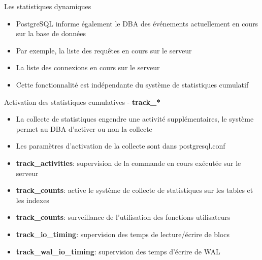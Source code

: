 
\begin{frame}[fragile]{Les statistiques dynamiques}

   \begin{itemize}
      \item PostgreSQL informe également le DBA des événements actuellement en cours sur la base de données
      \item Par exemple, la liste des requêtes en cours sur le serveur
      \item La liste des connexions en cours sur le serveur
      \item Cette fonctionnalité est indépendante du système de statistiques cumulatif
   \end{itemize}

\end{frame}


\begin{frame}[fragile]{Activation des statistiques cumulatives - \textbf{track\_*}}

   \begin{itemize}
      \item La collecte de statistiques engendre une activité supplémentaires, le système permet au DBA d'activer ou non la collecte
      \item Les paramètres d'activation de la collecte sont dans postgresql.conf
      \item \textbf{track\_activities}: supervision de la commande en cours exécutée sur le serveur
      \item \textbf{track\_counts}: active le système de collecte de statistiques sur les tables et les indexes
      \item \textbf{track\_counts}: surveillance de l'utilisation des fonctions utilisateurs
      \item \textbf{track\_io\_timing}: supervision des temps de lecture/écrire de blocs
      \item \textbf{track\_wal\_io\_timing}: supervision des temps d'écrire de WAL
   \end{itemize}

\begin{toile}
\end{toile}

\end{frame}

